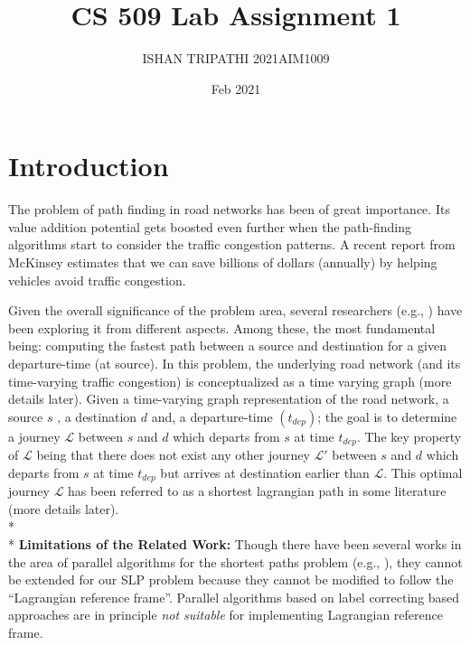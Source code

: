 \documentclass{article}
\title{CS 509 Lab Assignment 1}
\author{ISHAN TRIPATHI 2021AIM1009}
\date{Feb 2021}
\begin{document}
\maketitle

\section{Introduction}
The problem of path finding in road networks has been of great importance. Its value addition potential gets boosted even further when the path-finding algorithms start to consider the traffic congestion patterns. A recent report from McKinsey \cite{gunturi2015critical} estimates that we can save billions of dollars (annually) by helping vehicles avoid traffic congestion. \par
Given the overall significance of the problem area, several researchers (e.g., \cite{davidson2014work, demiryurek2010case}) have been exploring it from different aspects. Among these, the most fundamental being: computing the fastest path between a source and destination for a given departure-time (at source). In this problem, the underlying road network (and its time-varying traffic congestion) is conceptualized as a time varying graph (more details later). Given a time-varying graph representation of the road network, a source $s$ , a destination $d$ and, a departure-time $(t_{dep})$; the goal is to determine a journey $\mathcal{L}$ between $s$ and $d$ which departs from $s$ at time $t_{dep}$. The key property of $\mathcal{L}$ being that there does not exist any other journey $\mathcal{L'}$ between $s$ and $d$ which departs from $s$ at time $t_{dep}$ but arrives at destination earlier than $\mathcal{L}$. This optimal journey $\mathcal{L}$ has been referred to as a shortest lagrangian path in some literature \cite{demiryurek2010case} (more details later).
\\*
\\*
\textbf{Limitations of the Related Work:} Though there have been several works in the area of parallel algorithms
for the shortest paths problem (e.g., \cite{maleki2016dsmr, simmhan2015distributed, analytics2016age,chakaravarthy2016scalable}), they cannot be extended for our SLP problem because they
cannot be modified to follow the “Lagrangian reference frame”. Parallel algorithms \cite{analytics2016age, chakaravarthy2016scalable} based on label
correcting based approaches are in principle \emph{not suitable} for implementing Lagrangian reference frame.
\end{document}
